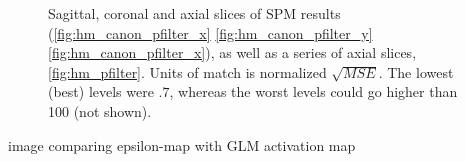 \begin{figure}
\caption{Sagittal, coronal and axial slices of SPM results (\autoref{fig:hm_canon_pfilter_x} \autoref{fig:hm_canon_pfilter_y} 
         \autoref{fig:hm_canon_pfilter_x}), as well as a series of axial slices, \autoref{fig:hm_pfilter}. 
         Units of match is normalized $\sqrt{MSE}$. The lowest (best) levels were $.7$,
         whereas the worst levels could go higher than 100 (not shown).}
\end{figure}

image comparing epsilon-map with GLM activation map

